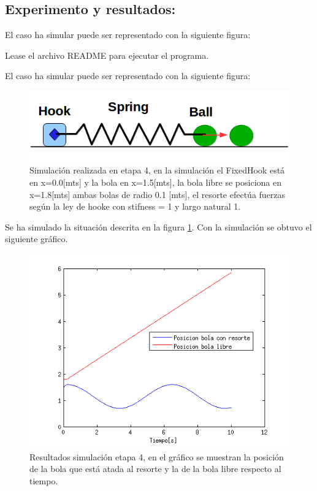 \documentclass[a4paper,10pt]{article}
\begin{document}
\subsection{Experimento y resultados:}

 El caso ha simular puede ser representado con la siguiente figura:

Lease el archivo README para ejecutar el programa.\newline
  
 El caso ha simular puede ser representado con la siguiente figura:
  
   \begin{figure}[H]
 \centering
 \includegraphics[scale=0.3]{./Figure1.png}
 \caption{Simulación realizada en etapa 4, en la simulación el FixedHook está en x=0.0[mts] y la bola en x=1.5[mts], la bola libre
 se posiciona en x=1.8[mts]
 ambas bolas de radio 0.1 [mts], el resorte efectúa fuerzas según la ley de hooke con stifness = 1 y largo natural 1.}
  \label{etapa4.1}
\end{figure}


Se ha simulado la situación descrita en la figura \ref{etapa4.1}. Con la simulación se obtuvo el siguiente gráfico.


\begin{figure}[H]
 \centering
 \includegraphics[scale=0.5]{./simulacion_etapa4.png}
 \caption{Resultados simulación etapa 4, en el gráfico se muestran la posición de la bola que está atada al resorte y la de la bola libre respecto al tiempo.}
  \label{etapa3.2}
\end{figure}
\end{document}
